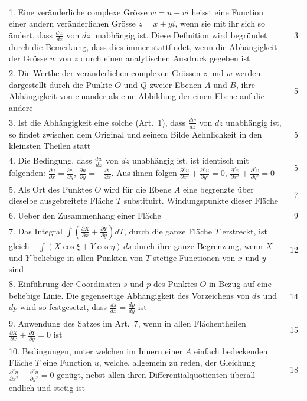 \documentclass[12pt,a4paper]{book}
\theoremstyle{definition}
\theoremstyle{remark}
\begin{document}
\begin{center}
\begin{tabular}{p{}r}
1. Eine veränderliche complexe Grösse $w = u + vi$ heisst eine Function einer andern veränderlichen Grösse $z = x + yi$, wenn sie mit ihr sich so ändert, dass $\frac{dw}{dz}$ von $dz$ unabhängig ist. Diese Definition wird begründet durch die Bemerkung, dass dies immer stattfindet, wenn die Abhängigkeit der Grösse $w$ von $z$ durch einen analytischen Ausdruck gegeben ist \dotfill & 3\\[0.5em]
2. Die Werthe der veränderlichen complexen Grössen $z$ und $w$ werden dargestellt durch die Punkte $O$ und $Q$ zweier Ebenen $A$ und $B$, ihre Abhängigkeit von einander als eine Abbildung der einen Ebene auf die andere \dotfill & 5\\[0.5em]
3. Ist die Abhängigkeit eine solche (Art.~1), dass $\frac{dw}{dz}$ von $dz$ unabhängig ist, so findet zwischen dem Original und seinem Bilde Aehnlichkeit in den kleinsten Theilen statt \dotfill & 5\\[0.5em]
4. Die Bedingung, dass $\frac{dw}{dz}$ von $dz$ unabhängig ist, ist identisch mit folgenden: $\frac{\partial u}{\partial x} = \frac{\partial v}{\partial y}$, $\frac{\partial u}{\partial y} = -\frac{\partial v}{\partial x}$. Aus ihnen folgen $\frac{\partial^2 u}{\partial x^2} + \frac{\partial^2 u}{\partial y^2} = 0$, $\frac{\partial^2 v}{\partial x^2} + \frac{\partial^2 v}{\partial y^2} = 0$ \dotfill & 5\\[0.5em]
5. Als Ort des Punktes $O$ wird für die Ebene $A$ eine begrenzte über dieselbe ausgebreitete Fläche $T$ substituirt. Windungspunkte dieser Fläche \dotfill & 7\\[0.5em]
6. Ueber den Zusammenhang einer Fläche \dotfill & 9\\[0.5em]
7. Das Integral $\int \left(\frac{\partial X}{\partial x} + \frac{\partial Y}{\partial y}\right) dT$, durch die ganze Fläche $T$ erstreckt, ist gleich $-\int (X \cos\xi + Y \cos\eta)\, ds$ durch ihre ganze Begrenzung, wenn $X$ und $Y$ beliebige in allen Punkten von $T$ stetige Functionen von $x$ und $y$ sind \dotfill & 12\\[0.5em]
8. Einführung der Coordinaten $s$ und $p$ des Punktes $O$ in Bezug auf eine beliebige Linie. Die gegenseitige Abhängigkeit des Vorzeichens von $ds$ und $dp$ wird so festgesetzt, dass $\frac{ds}{dx} = \frac{dp}{dy}$ ist \dotfill & 14\\[0.5em]
9. Anwendung des Satzes im Art.~7, wenn in allen Flächentheilen $\frac{\partial X}{\partial x} + \frac{\partial Y}{\partial y} = 0$ ist \dotfill & 15\\[0.5em]
10. Bedingungen, unter welchen im Innern einer $A$ einfach bedeckenden Fläche $T$ eine Function $u$, welche, allgemein zu reden, der Gleichung $\frac{\partial^2 u}{\partial x^2} + \frac{\partial^2 u}{\partial y^2} = 0$ genügt, nebst allen ihren Differentialquotienten überall endlich und stetig ist \dotfill & 18\\[0.5em]
\end{tabular}
\end{center}
\end{document}
